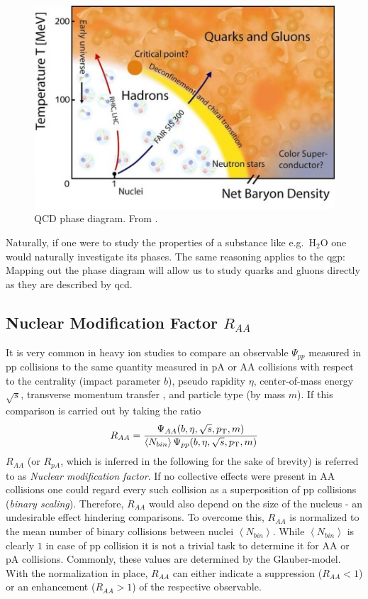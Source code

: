 \begin{figure}
  \centering
  \includegraphics[width=.6\textwidth]{figures/qcd-phase-diagram.png}
  \caption[QCD phase diagram.]{QCD phase diagram. From \cite{Scherer2004}.}
  \label{fig:qcd-phase-diagram}
\end{figure}

Naturally, if one were to study the properties of a substance like e.g.\ H$_2$O one would naturally investigate its phases. The same reasoning applies to the \gls{qgp}: Mapping out the phase diagram will allow us to study quarks and gluons directly as they are described by \gls{qcd}.


\subsection{Nuclear Modification Factor $R_{AA}$}
\label{sec:nuc_mod_factor}

It is very common in heavy ion studies to compare an observable $\Psi_{pp}$ measured in  \gls{pp} collisions to the same quantity measured in \gls{pA} or \gls{AA} collisions with respect to the centrality (impact parameter $b$), pseudo rapidity $\eta$, center-of-mass energy $\sqrt{s}$, transverse momentum transfer \pt, and particle type (by mass $m$). If this comparison is carried out by taking the ratio
\begin{equation}
  \label{eq:nuc_mod_factor}
  R_{AA} =
  \frac{\Psi_{AA}(b, \eta, \sqrt{s}, p_{\text{T}}, m)}
  {\left< N_{bin} \right>\Psi_{pp}(b, \eta, \sqrt{s}, p_{\text{T}}, m)}
\end{equation}
$R_{AA}$ (or $R_{pA}$, which is inferred in the following for the sake of brevity) is referred to as \emph{Nuclear modification factor}. If no collective effects were present in \gls{AA} collisions one could regard every such collision as a superposition of pp collisions (\emph{binary scaling}). Therefore, $R_{AA}$ would also depend on the size of the nucleus - an undesirable effect hindering comparisons. To overcome this, $R_{AA}$ is normalized to the mean number of binary collisions between nuclei $\left< N_{bin} \right>$. While $\left< N_{bin} \right>$ is clearly $1$ in case of pp collision it is not a trivial task to determine it for \gls{AA} or \gls{pA} collisions. Commonly, these values are determined by the Glauber-model. With the normalization in place, $R_{AA}$ can either indicate a suppression ($R_{AA} < 1$) or an enhancement ($R_{AA}> 1$) of the respective observable. 

